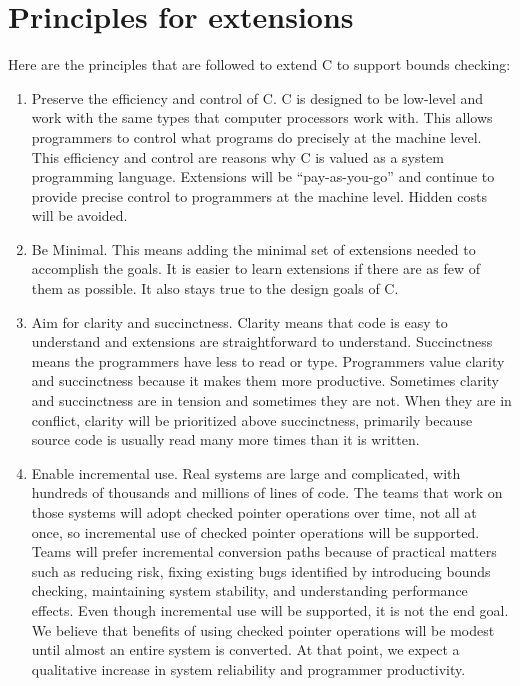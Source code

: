 \section{Principles for extensions}
\label{chapter:principles}

Here are the principles that are followed to extend C to support bounds checking:

\begin{enumerate}
\item
  Preserve the efficiency and control of C. C is designed to be
  low-level and work with the same types that computer processors work
  with. This allows programmers to
  control what programs do precisely at the
  machine level. This efficiency and control are reasons why C is valued as a
  system programming language. Extensions will be ``pay-as-you-go'' and
  continue to provide precise control to programmers at the machine
  level. Hidden costs will be avoided.
\item
  Be Minimal. This means adding the minimal set of extensions needed to
  accomplish the goals. It is easier to learn extensions if there are as
  few of them as possible. It also stays true to the design goals
  of C.
\item
  Aim for clarity and succinctness. Clarity means that code is easy to
  understand and extensions are straightforward to understand.
  Succinctness means the programmers have less to read or type.
  Programmers value clarity and succinctness because it makes them more
  productive.  Sometimes clarity and succinctness are in
  tension and sometimes they are not. When they are in conflict, clarity
  will be prioritized above succinctness, primarily because source code
  is usually read many more times than it is written.
\item
  Enable incremental use. Real systems are large and complicated, with
  hundreds of thousands and millions of lines of code. The teams that
  work on those systems will adopt checked pointer operations over time,
  not all at once, so incremental use of checked pointer operations will be
  supported. Teams will prefer incremental conversion paths because of
  practical matters such as reducing risk, fixing existing bugs
  identified by introducing bounds checking, maintaining system
  stability, and understanding performance effects. Even though
  incremental use will be supported, it is not the end goal. We believe
  that benefits of using checked pointer operations will be modest until
  almost an entire system is converted. At that point, we expect a
  qualitative increase in system reliability and programmer
  productivity.
\end{enumerate}

